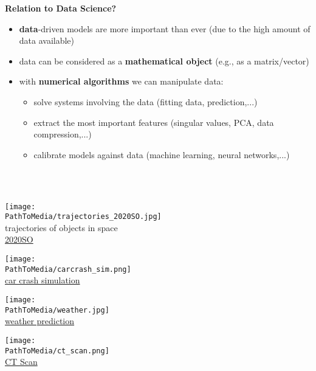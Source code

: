 %
\begin{frame}
\textbf{\color{header} Relation to Data Science?}~\\
\begin{itemize}
\item \textbf{data}-driven models are more important than ever (due to the high amount of data available) \vspace{0.2cm}
\item data can be considered
as a \textbf{mathematical object} (e.g., as a matrix/vector) \vspace{0.2cm}
\item with \textbf{numerical algorithms} we can manipulate data:\vspace{0.2cm}
\begin{itemize}\normalsize
	\item solve systems involving the data (fitting data, prediction,...)
	\vspace{0.2cm}\item extract the most important features (singular values, PCA, data compression,...) 
	\vspace{0.2cm}\item calibrate models against data (machine learning, neural networks,...)
\end{itemize}
\end{itemize}

~\\~\\
\begin{minipage}[t]{0.25\textwidth}\centering
	\texttt{[image: \\PathToMedia/trajectories\_2020SO.jpg]}\\
	trajectories of objects in space \\
	\hyperref{https://en.wikipedia.org/wiki/2020_SO\#/media/File:2020SO_b.gif}{}{}{2020SO} 
\end{minipage}
\begin{minipage}[t]{0.25\textwidth}\centering
	\texttt{[image: \\PathToMedia/carcrash\_sim.png]}\\
	\hyperref{https://www.emi.fraunhofer.de/en/business-units/automotive/research/Roentgen-Crashtest.html}{}{}{car crash simulation} 
\end{minipage}
\begin{minipage}[t]{0.25\textwidth}\centering
	\texttt{[image: \\PathToMedia/weather.jpg]}\\
	\hyperref{https://en.wikipedia.org/wiki/Numerical_weather_prediction}{}{}{weather prediction} 
\end{minipage}
\begin{minipage}[t]{0.25\textwidth} \centering
	\texttt{[image: \\PathToMedia/ct\_scan.png]}\\
	\hyperref{https://en.wikipedia.org/wiki/CT_scan}{}{}{CT Scan} 
\end{minipage}
\end{frame}
